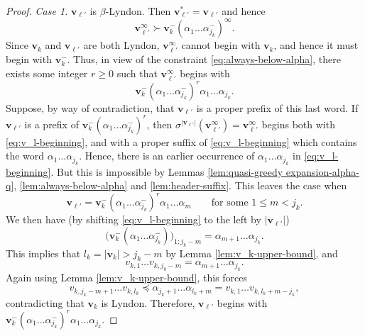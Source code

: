 \documentclass[10pt,a4paper]{amsart}
\newcommand{\al}{\alpha}
\newcommand{\f}{\infty}
\newcommand{\lle}{\preccurlyeq}
\newcommand{\si}{\sigma}
\renewcommand{\v}{\mathbf{v}}
\begin{document}
\begin{proof}
\medskip
{\em Case 1.} $\v_{\ell'}$ is $\beta$-Lyndon. Then $\v_{\ell'}^*=\v_{\ell'}$ and hence
\[
\v_{\ell'}^\f \succ \v_k^-(\al_1\dots\al_{j_k}^-)^\f.
\]
Since $\v_k$ and $\v_{\ell'}$ are both Lyndon, $\v_{\ell'}^\f$ cannot begin with $\v_k$, and hence it must begin with $\v_k^-$. Thus, in view of the constraint \eqref{eq:always-below-alpha}, there exists some integer $r\geq 0$ such that $\v_{\ell'}^\f$ begins with
\begin{equation} \label{eq:v_l-beginning}
\v_k^-(\al_1\dots\al_{j_k}^-)^r\al_1\dots\al_{j_k}.
\end{equation}
Suppose, by way of contradiction, that $\v_{\ell'}$ is a proper prefix of this last word. {If $\v_{\ell'}$ is a prefix of $\v_k^-(\al_1\dots\al_{j_k}^-)^r$, then $\si^{|\v_{\ell'}|}(\v_{\ell'}^\f)=\v_{\ell'}^\f$ begins both with \eqref{eq:v_l-beginning}, and with a proper suffix of \eqref{eq:v_l-beginning} which contains the word $\al_1\dots\al_{j_k}$. Hence, there is an earlier occurrence of $\al_1\dots\al_{j_k}$ in \eqref{eq:v_l-beginning}. But this is impossible by Lemmas \ref{lem:quasi-greedy expansion-alpha-q}, \ref{lem:always-below-alpha} and \ref{lem:header-suffix}. This leaves the case when
\[
\v_{\ell'}=\v_k^-(\al_1\dots\al_{j_k}^-)^r \al_1\dots\al_m \qquad\mbox{for some $1\leq m<j_k$}.
\]
We then have (by shifting \eqref{eq:v_l-beginning} to the left by $|\v_{\ell'}|$)
\[
\big(\v_k^-(\al_1\dots\al_{j_k}^-)\big)_{1:j_k-m}=\al_{m+1}\dots\al_{j_k}.
\]
This implies that $l_k=|\v_k|>j_k-m$ by Lemma \ref{lem:v_k-upper-bound}, and 
\[
v_{k,1}\dots v_{k,j_k-m}=\al_{m+1}\dots\al_{j_k}.
\]
Again using Lemma \ref{lem:v_k-upper-bound}, this forces
\[
v_{k,j_k-m+1}\dots v_{k,l_k}\lle \al_{j_k+1}\dots\al_{l_k+m}=v_{k,1}\dots v_{k,l_k+m-j_k},
\]
}
contradicting that $\v_k$ is Lyndon. Therefore, $\v_{\ell'}$ begins with $\v_k^-(\al_1\dots\al_{j_k}^-)^r\al_1\dots\al_{j_k}$.



\end{proof}
\end{document}
